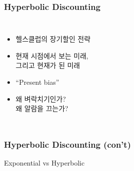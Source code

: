 \documentclass[final]{beamer}
\begin{document}
\begin{frame}\frametitle{Hyperbolic Discounting}\vspace{3.5em}
\begin{columns}
\column{14em}
\begin{itemize}
	\item 헬스클럽의 장기할인 전략
	\item 현재 시점에서 보는 미래, \\ 그리고 현재가 된 미래  
	\item ``Present bias''
	\item 왜 벼락치기인가? \\ 왜 알람을 끄는가?
\end{itemize}
\column{16em}
\end{columns}
\end{frame}
%
\begin{frame}\frametitle{Hyperbolic Discounting (con't)}\vspace{-1em}
\begin{center}
Exponential vs Hyperbolic\\[1em]
\end{center}
\hspace{-1em}
\end{frame}
%
\end{document}
